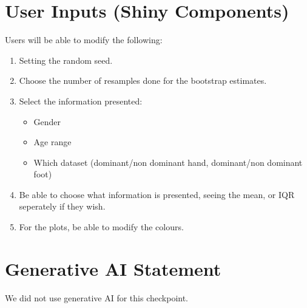 \documentclass{article}
\begin{document}
\begin{normalsize}
        \section{User Inputs (Shiny Components)}
        Users will be able to modify the following:
        \begin{enumerate}
            \item Setting the random seed.
            \item Choose the number of resamples done for the bootstrap estimates.
            \item Select the information presented: 
                \begin{itemize}
                    \item Gender
                    \item Age range
                    \item Which dataset (dominant/non dominant hand, dominant/non dominant foot)
                \end{itemize}
            \item Be able to choose what information is presented, seeing the mean, or IQR seperately if they wish.
            \item For the plots, be able to modify the colours.
        \end{enumerate}

        \section{Generative AI Statement}
        We did not use generative AI for this checkpoint.

\end{normalsize}

\nocite{*}


\vspace{0.8cm}
\end{document}
